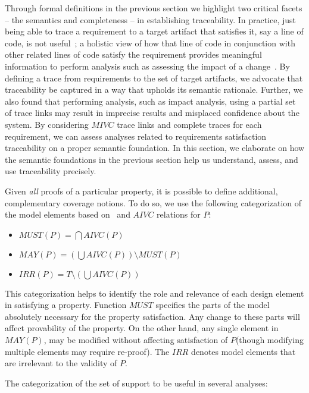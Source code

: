 Through formal definitions in the previous section we highlight two critical facets -- the semantics and completeness -- in establishing traceability.
In practice, just being able to trace a requirement to a target artifact that satisfies it, say a line of code, is not useful~\cite{guo2015trace}; a holistic view of how that line of code in conjunction with other related lines of code satisfy
the requirement provides meaningful information to perform analysis such as assessing the impact of a change~\cite{hull2010requirements}.
By defining a trace from requirements to the set of target artifacts, we advocate that traceability be captured in a way that upholds its semantic rationale. Further, we also found that performing analysis, such as impact analysis, using a partial set of trace links may result in imprecise results and misplaced confidence about the system.
By considering $MIVC$ trace links and complete traces for each requirement,
we can assess analyses related to requirements satisfaction traceability on a proper semantic foundation. In this section, we elaborate on how the semantic foundations in the previous section help us understand, assess, and use traceability precisely.

Given {\em all} proofs of a particular property, it is possible to define additional, complementary coverage notions.
To do so, we use the following categorization of the model elements based on \mivc ~and
$AIVC$ relations for $P$:

\begin{itemize}
\item $MUST (P) = \bigcap AIVC(P)$
\item $MAY(P) = (\bigcup AIVC (P)) \setminus MUST (P)$
\item $IRR(P) = T \setminus (\bigcup AIVC (P))$
\end{itemize}

\noindent This categorization helps to identify the role and relevance of each design element in satisfying a property. Function $MUST$ specifies the parts of the model absolutely necessary for the property satisfaction.  Any change to these parts will affect provability of the property. On the other hand, any single element in $MAY (P)$, may be modified without affecting satisfaction of $P$(though modifying multiple elements may require re-proof). The $IRR$ denotes model elements that are irrelevant to the validity of $P$.

The categorization of the set of support to be useful in several analyses:

